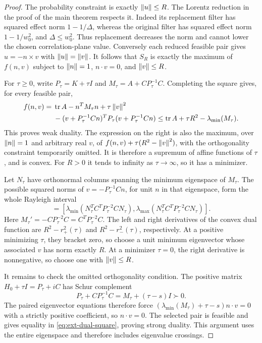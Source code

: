 \begin{proof}
The probability constraint is exactly $\left\lVert u\right\rVert\le R$.
The Lorentz reduction in the proof of the main theorem respects it.
Indeed its replacement filter has squared effect norm
$1-1/\Delta$, whereas the original filter has squared effect norm
$1-1/w_0^2$, and $\Delta\le w_0^2$.
Thus replacement decreases the norm and cannot lower the chosen
correlation-plane value. Conversely each reduced feasible pair gives
$u=-n\times v$ with $\left\lVert u\right\rVert=\left\lVert v\right\rVert$.
It follows that $S_R$ is exactly the maximum of $f(n,v)$ subject to
$\left\lVert n\right\rVert=1$, $n\cdot v=0$, and $\left\lVert v\right\rVert\le R$.

For $\tau\ge0$, write
$P_\tau=K+\tau I$ and $M_\tau=A+CP_\tau^{-1}C$.
Completing the square gives, for every feasible pair,
\begin{align}
 f(n,v)
 ={}&\operatorname{tr} A-n^TM_\tau n+\tau\left\lVert v\right\rVert^2 \notag\\
    &-(v+P_\tau^{-1}Cn)^TP_\tau
                  (v+P_\tau^{-1}Cn)
 \le\operatorname{tr} A+\tau R^2-\lambda_{\min}(M_\tau).
 \label{eq:ext-dual-square}
\end{align}
This proves weak duality. The expression on the right is also the
maximum, over $\left\lVert n\right\rVert=1$ and arbitrary real $v$, of
$f(n,v)+\tau(R^2-\left\lVert v\right\rVert^2)$, with the orthogonality constraint
temporarily omitted. It is therefore a supremum of affine functions
of $\tau$, and is convex. For $R>0$ it tends to infinity as
$\tau\to\infty$, so it has a minimizer.

Let $N_\tau$ have orthonormal columns spanning the minimum eigenspace
of $M_\tau$.
The possible squared norms of
$v=-P_\tau^{-1}Cn$, for unit $n$ in that eigenspace, form the whole
Rayleigh interval
\begin{equation}
 [r_-^2(\tau),r_+^2(\tau)]
 =\left[
 \lambda_{\min}(N_\tau^TC^TP_\tau^{-2}CN_\tau),
 \lambda_{\max}(N_\tau^TC^TP_\tau^{-2}CN_\tau)
 \right].
 \label{eq:ext-radius-interval}
\end{equation}
Here $M_\tau'=-CP_\tau^{-2}C=C^TP_\tau^{-2}C$.
The left and right derivatives of the convex dual function are
$R^2-r_+^2(\tau)$ and $R^2-r_-^2(\tau)$, respectively.
At a positive minimizing $\tau$, they bracket zero, so choose a unit
minimum eigenvector whose associated $v$ has norm exactly $R$.
At a minimizer $\tau=0$, the right derivative is nonnegative,
so choose one with $\left\lVert v\right\rVert\le R$.

It remains to check the omitted orthogonality condition.
The positive matrix $H_0+\tau I=P_\tau+iC$ has Schur complement
\[
 P_\tau+CP_\tau^{-1}C
 =M_\tau+(\tau-s)I\succ0.
\]
The paired eigenvector equations therefore force
$(\lambda_{\min}(M_\tau)+\tau-s)n\cdot v=0$ with a strictly
positive coefficient, so $n\cdot v=0$.
The selected pair is feasible and gives equality in
\eqref{eq:ext-dual-square}, proving strong duality.
This argument uses the entire eigenspace and therefore includes
eigenvalue crossings.


\end{proof}
